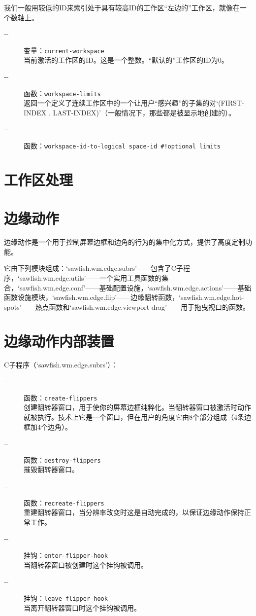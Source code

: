 \documentclass{book}
\begin{document}
\begin{CJK*}{UTF8}{gbsn}
我们一般用较低的ID来索引处于具有较高ID的工作区``左边的''工作区，就像在一个数轴上。
\begin{description}
\item[-{}-] 变量：\verb|current-workspace|\\
当前激活的工作区的ID。这是一个整数。``默认的''工作区的ID为0。
\item[-{}-] 函数：\verb|workspace-limits|\\
返回一个定义了连续工作区中的一个让用户``感兴趣''的子集的对`(FIRST-INDEX . LAST-INDEX)'（一般情况下，那些都是被显示地创建的）。
\item[-{}-] 函数：\verb|workspace-id-to-logical space-id #!optional limits|\\

\end{description}

\section{工作区处理}
\section{边缘动作}
边缘动作是一个用于控制屏幕边框和边角的行为的集中化方式，提供了高度定制功能。

它由下列模块组成：`sawfish.wm.edge.subrs'------包含了C子程序，`sawfish.wm.edge.utils'------一个实用工具函数的集合，`sawfish.wm.edge.conf'------基础配置设施，`sawfish.wm.edge.actions'------基础函数设施模块，`sawfish.wm.edge.flip'------边缘翻转函数，`sawfish.wm.edge.hot-spots'------热点函数和`sawfish.wm.edge.viewport-drag'------用于拖曳视口的函数。
\section{边缘动作内部装置}
C子程序（`sawfish.wm.edge.subrs'）：
\begin{description}
\item[-{}-] 函数：\verb|create-flippers|\\
创建翻转器窗口，用于使你的屏幕边框纯粹化。当翻转器窗口被激活时动作就被执行。技术上它是一个窗口，但在用户的角度它由8个部分组成（4条边框加4个边角）。
\item[-{}-] 函数：\verb|destroy-flippers|\\
摧毁翻转器窗口。
\item[-{}-] 函数：\verb|recreate-flippers|\\
重建翻转器窗口，当分辨率改变时这是自动完成的，以保证边缘动作保持正常工作。
\item[-{}-] 挂钩：\verb|enter-flipper-hook|\\
当翻转器窗口被创建时这个挂钩被调用。
\item[-{}-] 挂钩：\verb|leave-flipper-hook|\\
当离开翻转器窗口时这个挂钩被调用。
\end{description}



\end{CJK*}
\end{document}
